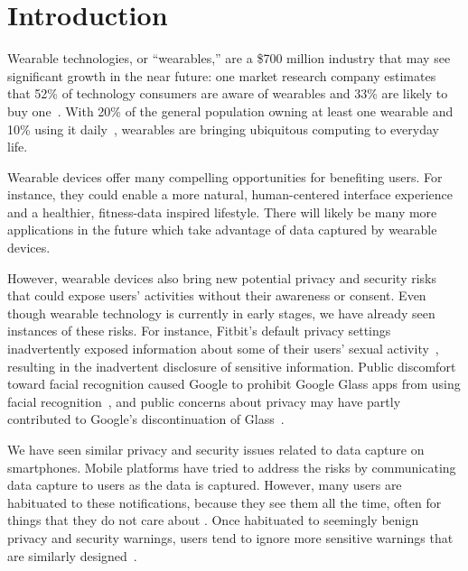 
\section{Introduction}

Wearable technologies, or ``wearables,'' are a \$700 million industry \cite{cmo} that may see significant growth in the near future: one market research company estimates that 52\% of technology consumers are aware of wearables and 33\% are likely to buy one~\cite{NPD}. With 20\% of the general population owning at least one wearable and 10\% using it daily~\cite{WearableStatNews}, wearables are bringing ubiquitous computing to everyday life.


Wearable devices offer many compelling opportunities for benefiting users.  For instance, they could enable a more natural, human-centered interface experience and a healthier, fitness-data inspired lifestyle. There will likely be many more applications in the future which take advantage of data captured by wearable devices.

However, wearable devices also bring new potential privacy and security risks that could expose users' activities without their awareness or consent. Even though wearable technology is currently in early stages, we have already seen instances of these risks. For instance, Fitbit's default privacy settings inadvertently exposed information about some of their users' sexual activity~\cite{Fitbit}, resulting in the inadvertent disclosure of sensitive information. Public discomfort toward facial recognition caused Google to prohibit Google Glass apps from using facial recognition~\cite{GlassDetection}, and public concerns about privacy may have partly contributed to Google's discontinuation of Glass~\cite{14_dvorak_2014,1_russell_2014, 15_mashable_2014, 16_gross_2014}.

We have seen similar privacy \cite{kelley2013privacy, sadeh2009understanding, shklovski2014leakiness} and security issues \cite{enck2011study, felt2011survey} related to data capture on smartphones. Mobile platforms have tried to address the risks by communicating data capture to users as the data is captured. However, many users are habituated to these notifications, because they see them all the time, often for things that they do not care about \cite{felt2012android}. Once habituated to seemingly benign privacy and security warnings, users tend to ignore more sensitive warnings that are similarly designed~\cite{Egelman08}.

